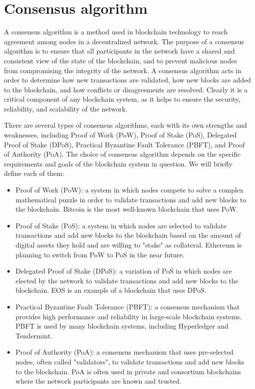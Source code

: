 \documentclass[target=mst,aauheader=]{thud}
\begin{document}
    \section{Consensus algorithm}
    
    A consensus algorithm is a method used in blockchain technology to reach agreement among nodes in a decentralized network. The purpose of a consensus algorithm is to ensure that all participants in the network have a shared and consistent view of the state of the blockchain, and to prevent malicious nodes from compromising the integrity of the network.
    A consensus algorithm acts in order to determine how new transactions are validated, how new blocks are added to the blockchain, and how conflicts or disagreements are resolved. Clearly it is a critical component of any blockchain system, as it helps to ensure the security, reliability, and scalability of the network.
    
    There are several types of consensus algorithms, each with its own strengths and weaknesses, including Proof of Work (PoW), Proof of Stake (PoS), Delegated Proof of Stake (DPoS), Practical Byzantine Fault Tolerance (PBFT), and Proof of Authority (PoA). The choice of consensus algorithm depends on the specific requirements and goals of the blockchain system in question. 
    We will briefly define each of them:
    
    \begin{itemize}    

        \item Proof of Work (PoW): a system in which nodes compete to solve a complex mathematical puzzle in order to validate transactions and add new blocks to the blockchain. Bitcoin is the most well-known blockchain that uses PoW.
        \item Proof of Stake (PoS): a system in which nodes are selected to validate transactions and add new blocks to the blockchain based on the amount of digital assets they hold and are willing to "stake" as collateral. Ethereum is planning to switch from PoW to PoS in the near future.
        \item Delegated Proof of Stake (DPoS): a variation of PoS in which nodes are elected by the network to validate transactions and add new blocks to the blockchain. EOS is an example of a blockchain that uses DPoS.
        \item Practical Byzantine Fault Tolerance (PBFT): a consensus mechanism that provides high performance and reliability in large-scale blockchain systems. PBFT is used by many blockchain systems, including Hyperledger and Tendermint.
        \item Proof of Authority (PoA): a consensus mechanism that uses pre-selected nodes, often called "validators", to validate transactions and add new blocks to the blockchain. PoA is often used in private and consortium blockchains where the network participants are known and trusted.

    \end{itemize}
\end{document}
